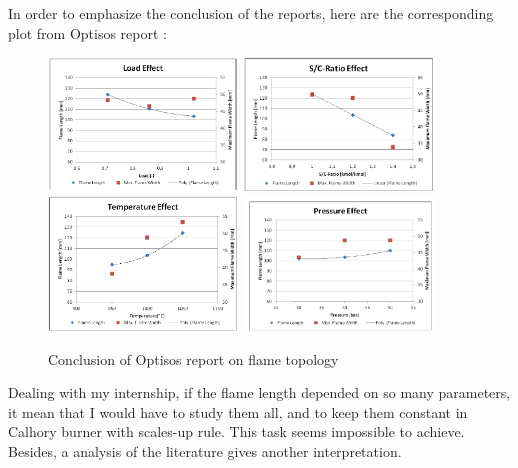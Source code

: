 In order to emphasize the conclusion of the reports, here are the corresponding plot from Optisos report :

\begin{figure}[h!]
  \centering
\includegraphics[width=0.45\textwidth]{fig/Optisos_Load_effect.PNG}
\includegraphics[width=0.45\textwidth]{fig/Optisos_S_C_effect.PNG}
\includegraphics[width=0.45\textwidth]{fig/Optisos_temperature_effect.PNG}
\includegraphics[width=0.45\textwidth]{fig/Optisos_Pressure_effect.PNG}
  \caption{Conclusion of Optisos report on flame topology}
 \label{optisos_plot}
\end{figure}

Dealing with my internship, if the flame length depended on so many parameters, it mean that I would have to study them all, and to keep them constant in Calhory burner with scales-up rule. This task seems impossible to achieve. Besides, a analysis of  the literature gives another interpretation. 




